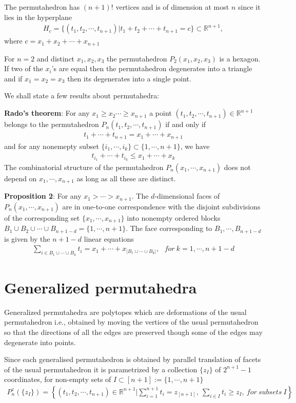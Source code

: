 \documentclass[hidelinks,12pt]{article}
\newcommand{\bea}[1]{\begin{eqnarray}\label{#1} }
\newcommand{\eea}{\end{eqnarray}}
\def\bea{\begin{eqnarray}}
\def\eea{\end{eqnarray}}
\begin{document}
 The permutahedron has $(n+1)!$ vertices and is of dimension at most $n$ since it lies in the hyperplane 
 \bea
 H_c= \{(t_1,t_2, \cdots, t_{n+1}) | t_1 + t_2 + \cdots + t_{n+1}= c \} \subset \mathbb{R}^{n+1}, \nonumber
 \eea
where $c= x_1+x_2+ \cdots +x_{n+1}$

For $n=2$ and distinct $x_1,x_2, x_3$ the permutahedron $P_2(x_1,x_2, x_3)$ is a hexagon. If two of the $x_i$'s are equal then the permutahedron degenerates into a triangle and if $x_1= x_2 = x_3$ then its degenerates into a single point.

We shall state a few results about permutahedra:

{\bf Rado's theorem}: For any $x_1 \ge x_2  \cdots \ge x_{n+1}$ a point $(t_1,t_2, \cdots, t_{n+1}) \in \mathbb{R}^{n+1}$ belongs to the permutahedron $P_n(t_1,t_2, \cdots, t_{n+1})$ if and only if 
\bea
t_1+ \cdots +t_{n+1} = x_1 +\cdots+ x_{n+1} \nonumber
\eea
and for any nonemepty subset $\{i_1,\cdots,i_k \} \subset \{1,\cdots, n+1 \}$, we have 
\bea
t_{i_1}+ \cdots +t_{i_k} \leq x_1 +\cdots+ x_k \nonumber
\eea
The combinatorial structure of the permutahedron $P_n (x_1, \cdots, x_{n+1}) $ does not depend on $ x_1, \cdots, x_{n+1} $ as long as all these are distinct. 

{\bf Proposition 2}: For any  $x_1> \cdots > x_{n+1} $. The $d$-dimensional faces of $P_n ( x_1, \cdots, x_{n+1 })$ are in one-to-one correspondence with the disjoint subdivisions of the corresponding set $\{x_1,\cdots, x_{n+1 }\}$ into nonempty ordered blocks $B_1 \cup B_2 \cup \cdots \cup B_{n+1-d} =\{1,\cdots,n+1 \}$. The face corresponding to $B_1,\cdots, B_{n+1-d}$ is given by the $n+1-d$ linear equations 
\bea
\sum_{i \in B_1\cup \cdots \cup B_k} t_i = x_1 + \cdots +x_{| B_1 \cup \cdots \cup B_k |}, ~~~ for~ k=1,\cdots,n+1-d \nonumber
\eea 
\section*{Generalized permutahedra}
Generalized permutahedra are polytopes which are deformations of the usual permutahedron i.e., obtained by moving the vertices of the usual permutahedron so that the directions of all the edges are preserved though some of the edges may degenerate into points.

 Since each generalised permutahedron is obtained by parallel translation of facets of the usual permutahedron it is parametrized  by a collection $\{ z_I\}$ of $2^{n+1}-1$ coordinates, for non-empty sets of $I \subset [n+1] := \{1,\cdots,n+1 \}$
 \bea
 P_n^z(\{ z_I \}) = \left \{ (t_1, t_2, \cdots , t_{n+1}) \in \mathbb{R}^{n+1} | \sum_{i=1}^{n+1} t_i = z_{[n+1]},~ \sum_{i \in I} t_i \geq z_I, ~for ~subsets~ I  \right  \} \nonumber
 \eea
 
\end{document}
